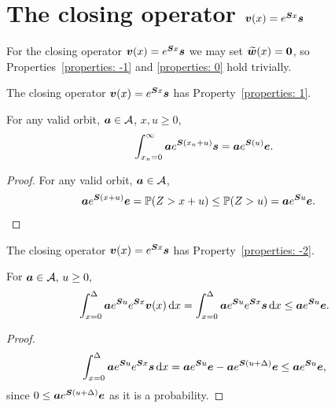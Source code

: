 \section{The closing operator \(\boldsymbol v(x) = e^{\boldsymbol S x}\boldsymbol s\)}
For the closing operator \(\boldsymbol v(x) = e^{\boldsymbol Sx}\boldsymbol s\) we may set \(\widetilde{\boldsymbol w}(x) = \boldsymbol 0\), so Properties~\ref{properties: -1} and \ref{properties: 0} hold trivially.

\begin{lem}\label{lem: akc}
	The closing operator \(\boldsymbol v(x) = e^{\boldsymbol Sx}\boldsymbol s\) has Property~\ref{properties: 1}.
	
	For any valid orbit, \(\boldsymbol a\in\mathcal A\), \(x,u\geq 0\), 
		\begin{align*}
			\int_{x_n=0}^\infty \boldsymbol a e^{\boldsymbol{S}(x_n+u)}\boldsymbol s = \boldsymbol a e^{\boldsymbol{S}(u)}\boldsymbol e. 
		\end{align*}
	\end{lem}
	\begin{proof}
		For any valid orbit, \(\boldsymbol a\in\mathcal A\), 
			\begin{align*}
					\boldsymbol a e^{\boldsymbol{S}(x+u)}\boldsymbol e &= \mathbb P(Z>x+u) \leq\mathbb P(Z>u) = \boldsymbol a e^{\boldsymbol Su} \boldsymbol e. 
		\end{align*}
	\end{proof}

\begin{cor}
	The closing operator \(\boldsymbol v(x) = e^{\boldsymbol S x}\boldsymbol s\) has Property~\ref{properties: -2}.
	
	For \(\boldsymbol a\in\mathcal A,\, u\geq 0, \)
	\[\int_{x=0}^\Delta \boldsymbol a e^{\boldsymbol Su}e^{\boldsymbol Sx}\boldsymbol v(x)\, \mathrm{d} x = \int_{x=0}^\Delta \boldsymbol a e^{\boldsymbol Su}e^{\boldsymbol Sx}\boldsymbol s\, \mathrm{d} x \leq \boldsymbol a e^{\boldsymbol Su}\boldsymbol e.\]	
\end{cor}
\begin{proof}
	\[\int_{x=0}^\Delta \boldsymbol a e^{\boldsymbol Su}e^{\boldsymbol Sx}\boldsymbol s\, \mathrm{d} x = \boldsymbol a e^{\boldsymbol Su}\boldsymbol e-\boldsymbol a e^{\boldsymbol S(u+\Delta)}\boldsymbol e \leq \boldsymbol a e^{\boldsymbol Su}\boldsymbol e,\]
	since \(0\leq \boldsymbol a e^{\boldsymbol S(u+\Delta)}\boldsymbol e\) as it is a probability. 
\end{proof}

